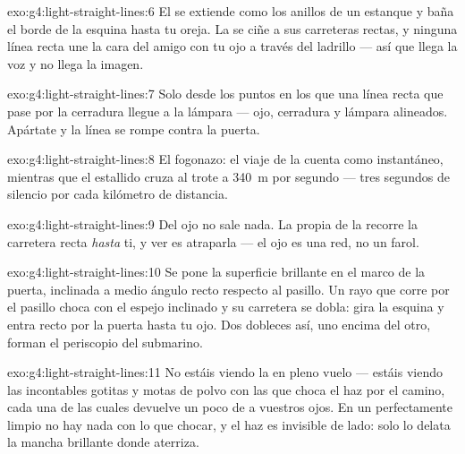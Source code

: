 \begin{solution}{exo:g4:light-straight-lines:6}
El  se extiende como los anillos de un estanque y baña el borde
de la esquina hasta tu oreja. La  se ciñe a sus carreteras
rectas, y ninguna línea recta une la cara del amigo con tu ojo a
través del ladrillo --- así que llega la voz y no llega la imagen.
\end{solution}

\begin{solution}{exo:g4:light-straight-lines:7}
Solo desde los puntos en los que una línea recta que pase por la
cerradura llegue a la lámpara --- ojo, cerradura y lámpara alineados.
Apártate y la línea se rompe contra la puerta.
\end{solution}

\begin{solution}{exo:g4:light-straight-lines:8}
El fogonazo: el viaje de la  cuenta como instantáneo, mientras
que el estallido cruza al trote a \qty{340}{m} por segundo --- tres
segundos de silencio por cada kilómetro de distancia.
\end{solution}

\begin{solution}{exo:g4:light-straight-lines:9}
Del ojo no sale nada. La  propia de la  recorre la
carretera recta \emph{hasta} ti, y ver es atraparla --- el ojo es una
red, no un farol.
\end{solution}

\begin{solution}{exo:g4:light-straight-lines:10}
Se pone la superficie brillante en el marco de la puerta, inclinada a
medio ángulo recto respecto al pasillo. Un rayo que corre por el
pasillo choca con el espejo inclinado y su carretera se dobla: gira la
esquina y entra recto por la puerta hasta tu ojo. Dos dobleces así,
uno encima del otro, forman el periscopio del submarino.
\end{solution}

\begin{solution}{exo:g4:light-straight-lines:11}
No estáis viendo la  en pleno vuelo --- estáis viendo las
incontables gotitas y motas de polvo con las que choca el haz por el
camino, cada una de las cuales devuelve un poco de  a vuestros
ojos. En un  perfectamente limpio no hay nada con lo que chocar, y
el haz es invisible de lado: solo lo delata la mancha brillante donde
aterriza.
\end{solution}
